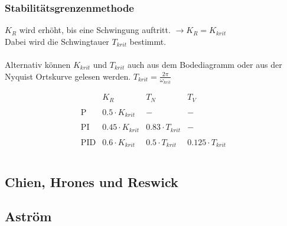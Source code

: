 \subsubsection{Stabilitätsgrenzenmethode}
$K_R$ wird erhöht, bis eine Schwingung auftritt. $\to K_R = K_{krit}$\\
Dabei wird die Schwingtauer $T_{krit}$ bestimmt. \\\\
Alternativ können $K_{krit}$ und $T_{krit}$ auch aus dem Bodediagramm oder 
aus der Nyquist Ortskurve gelesen werden. $T_{krit} = \frac{2 \pi}{\omega_{krit}}$
\begin{table}[h!]
    \[
        \begin{array}{lccc}
            &
                K_R &
                T_N &
                T_V \\\\
            \text{P} &
                0.5 \cdot K_{krit} &
                - &
                - \\\\
            \text{PI} &
                0.45 \cdot K_{krit} &
                0.83 \cdot T_{krit} &
                - \\\\
            \text{PID} &
                0.6 \cdot K_{krit} &
                0.5 \cdot T_{krit} &
                0.125 \cdot T_{krit} \\\\
        \end{array}
    \]
\end{table}


\subsection{Chien, Hrones und Reswick}


\subsection{Aström}


